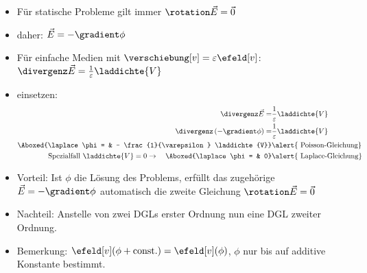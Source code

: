       \begin{frame}

        \begin{itemize}[<+->]
        \item Für statische Probleme gilt immer \qquad$\rotation\vec{E} = \vec{0}$
        \item daher: \hspace{4cm} $\vec{E} = - \gradient \phi$
          \item Für \alert{einfache} Medien mit $\verschiebung[v] = \varepsilon \efeld[v]$:\qquad $\divergenz \vec{E} =
            \frac{1}{\varepsilon} \laddichte{V} $
          \item einsetzen:
            \begin{align*}
            \divergenz \vec{E} = &
                             \frac{1}{\varepsilon} \laddichte{V}\\
              \divergenz\left(-\gradient \phi\right) =& \frac{1}{\varepsilon}
                                              \laddichte{V}\\
            \Aboxed{\laplace \phi = & - \frac{1}{\varepsilon}
                                      \laddichte{V}} & \text{\alert{
                                                       Poisson-Gleichung}}\\
              \text{Spezialfall } \laddichte{V}=0 \to\quad \Aboxed{\laplace \phi = & 0} & \text{\alert{
                                                       Laplace-Gleichung}}
            \end{align*}
            \item Vorteil: Ist $\phi$ die Lösung des Problems, erfüllt
              das zugehörige $\vec{E} = - \gradient \phi$ \alert{automatisch} die
              zweite Gleichung $\rotation\vec{E} = \vec{0}$
              \item Nachteil: Anstelle von zwei DGLs erster Ordnung nun
                eine \alert{DGL zweiter Ordnung}.
                \item Bemerkung: $\efeld[v](\phi + \text{const.}) =
                  \efeld[v](\phi)$, $\phi$ nur bis auf additive
                  Konstante bestimmt.
          \end{itemize}

        
        \end{frame}

